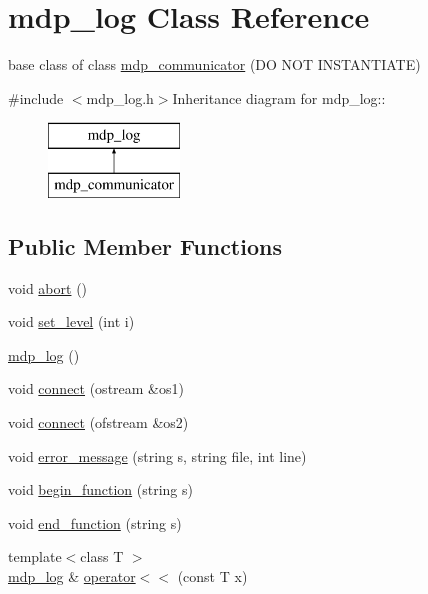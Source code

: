 \hypertarget{classmdp__log}{
\section{mdp\_\-log Class Reference}
\label{classmdp__log}
}


base class of class \hyperlink{classmdp__communicator}{mdp\_\-communicator} (DO NOT INSTANTIATE)  


{\ttfamily \#include $<$mdp\_\-log.h$>$}Inheritance diagram for mdp\_\-log::\begin{figure}[H]
\begin{center}
\leavevmode
\includegraphics[height=2cm]{classmdp__log}
\end{center}
\end{figure}
\subsection*{Public Member Functions}
\begin{DoxyCompactItemize}
\item 
void \hyperlink{classmdp__log_a0e85794c9c7fdaf944eb70d1f2c0ecc5}{abort} ()
\item 
void \hyperlink{classmdp__log_a368a098416aa38fa3395607848a2c5f1}{set\_\-level} (int i)
\item 
\hyperlink{classmdp__log_a76a398101c2618249099be4fda3ce26c}{mdp\_\-log} ()
\item 
void \hyperlink{classmdp__log_a8e468b9b08d5008bbf87207a0184c809}{connect} (ostream \&os1)
\item 
void \hyperlink{classmdp__log_a9f9fbc3647e989231c4016179c2932d3}{connect} (ofstream \&os2)
\item 
void \hyperlink{classmdp__log_a675c488f1e494a9bd3a7466b300ec09a}{error\_\-message} (string s, string file, int line)
\item 
void \hyperlink{classmdp__log_a7fac0134af18caa8311bbf3118b82df1}{begin\_\-function} (string s)
\item 
void \hyperlink{classmdp__log_aeb82bba50423232fe8ad3a37ed65799d}{end\_\-function} (string s)
\item 
{\footnotesize template$<$class T $>$ }\\\hyperlink{classmdp__log}{mdp\_\-log} \& \hyperlink{classmdp__log_aa60825a5c02a42c5d1688a60d8da7516}{operator$<$$<$} (const T x)
\end{DoxyCompactItemize}

